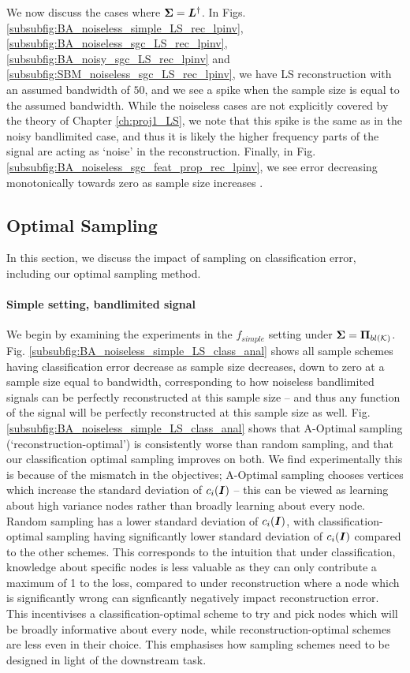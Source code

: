We now discuss the cases where $\bm{\Sigma} = \bm{L}^{\dagger}$. In Figs. \ref{subsubfig:BA_noiseless_simple_LS_rec_lpinv}, \ref{subsubfig:BA_noiseless_sgc_LS_rec_lpinv}, \ref{subsubfig:BA_noisy_sgc_LS_rec_lpinv} and \ref{subsubfig:SBM_noiseless_sgc_LS_rec_lpinv}, we have LS reconstruction with an assumed bandwidth of $50$, and we see a spike when the sample size is equal to the assumed bandwidth. While the noiseless cases are not explicitly covered by the theory of Chapter \ref{ch:proj1_LS}, we note that this spike is the same as in the noisy bandlimited case, and thus it is likely the higher frequency parts of the signal are acting as `noise' in the reconstruction. Finally, in Fig. \ref{subsubfig:BA_noiseless_sgc_feat_prop_rec_lpinv}, we see error decreasing monotonically towards zero as sample size increases .


\subsection{Optimal Sampling}
\label{sec:optimal_sampling_results}
In this section, we discuss the impact of sampling on classification error, including our optimal sampling method. 
\paragraph{Simple setting, bandlimited signal}We begin by examining the experiments in the $f_{simple}$ setting under $\matr{\Sigma}=\projbl$. Fig. \ref{subsubfig:BA_noiseless_simple_LS_class_anal} shows all sample schemes having classification error decrease as sample size decreases, down to zero at a sample size equal to bandwidth, corresponding to how noiseless bandlimited signals can be perfectly reconstructed at this sample size -- and thus any function of the signal will be perfectly reconstructed at this sample size as well.  Fig. \ref{subsubfig:BA_noiseless_simple_LS_class_anal} shows that A-Optimal sampling (`reconstruction-optimal') is consistently worse than random sampling, and that our classification optimal sampling improves on both. We find experimentally this is because of the mismatch in the objectives; A-Optimal sampling chooses vertices which increase the standard deviation of $c_{i}(\bm{I})$ -- this can be viewed as learning about high variance nodes rather than broadly learning about every node. Random sampling has a lower standard deviation of $c_{i}(\bm{I})$, with classification-optimal sampling having significantly lower standard deviation of $c_{i}(\bm{I})$ compared to the other schemes. This corresponds to the intuition that under classification, knowledge about specific nodes is less valuable as they can only contribute a maximum of 1 to the loss, compared to under reconstruction where a node which is significantly wrong can signficantly negatively impact reconstruction error. This incentivises a classification-optimal scheme to try and pick nodes which will be broadly informative about every node, while reconstruction-optimal schemes are less even in their choice. This emphasises how sampling schemes need to be designed in light of the downstream task.

